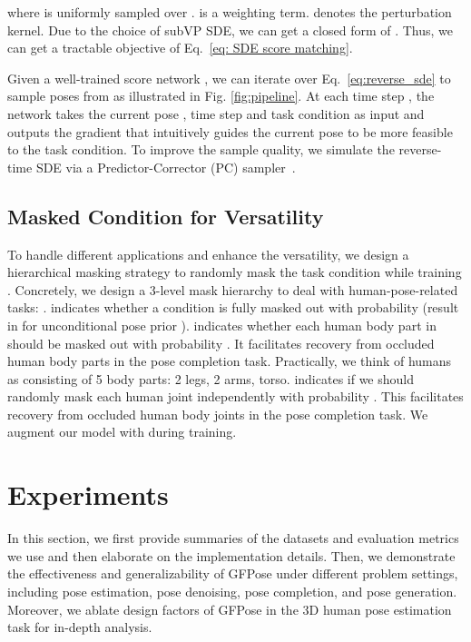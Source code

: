 \documentclass[10pt,twocolumn,letterpaper]{article}
\begin{document}
where  is uniformly sampled over .  is a weighting term.  denotes the perturbation kernel. Due to the choice of subVP SDE, we can get a closed form of . Thus, we can get a tractable objective of Eq.~\ref{eq: SDE score matching}. 







Given a well-trained score network , we can iterate over Eq.~\ref{eq:reverse_sde} to sample poses from  as illustrated in Fig. \ref{fig:pipeline}. At each time step , the network takes the current pose , time step  and task condition  as input and outputs the gradient  that intuitively guides the current pose to be more feasible to the task condition. To improve the sample quality, we simulate the reverse-time SDE via a Predictor-Corrector (PC) sampler~\cite{song2020score}. 








\subsection{Masked Condition for Versatility}
\label{subsec:mask_condition}
To handle different applications and enhance the versatility, we design a hierarchical masking strategy to randomly mask the task condition  while training .
Concretely, we design a 3-level mask hierarchy to deal with human-pose-related tasks: .  indicates whether a condition  is fully masked out with probability  (result in  for unconditional pose prior ).  indicates whether each human body part in  should be masked out with probability . It facilitates recovery from occluded human body parts in the pose completion task. Practically, we think of humans as consisting of 5 body parts: 2 legs, 2 arms, torso.  indicates if we should randomly mask each human joint independently with probability . This facilitates recovery from occluded human body joints in the pose completion task. We augment our model  with  during training. 









 

\section{Experiments}
\label{sec:experiments}
In this section, we first provide summaries of the datasets and evaluation metrics we use and then elaborate on the implementation details. 
Then, we demonstrate the effectiveness and generalizability of GFPose under different problem settings, including pose estimation, pose denoising, pose completion, and pose generation.
Moreover, we ablate design factors of GFPose in the 3D human pose estimation task for in-depth analysis.
\end{document}
